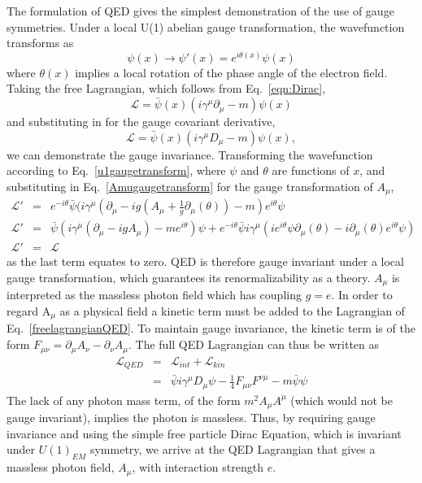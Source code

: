 The formulation of \ac{QED} gives the simplest demonstration of the use of gauge symmetries.
Under a local U(1) abelian gauge transformation, the wavefunction transforms as
\begin{equation}
\psi(x) \rightarrow \psi'(x) = e^{i \theta (x)} \psi(x)
\label{u1gaugetransform}
\end{equation}
where $\theta (x)$ implies a local rotation of the phase angle of the electron field.
Taking the free Lagrangian, which follows from Eq.~\ref{eqn:Dirac},
\begin{equation}
\mathcal{L} =  \bar{\psi}(x) (i \gamma ^{\mu} \partial_{\mu} - m) \psi(x)
\end{equation}
and substituting in for the gauge covariant derivative,
\begin{equation}
\mathcal{L} =  \bar{\psi}(x)(i \gamma ^{\mu} D_{\mu} - m) \psi(x),
\label{freelagrangianQED}
\end{equation}
we can demonstrate the gauge invariance. 
Transforming the wavefunction according to Eq.~\ref{u1gaugetransform}, where $\psi$ and $\theta$ are functions of 
$x$, and substituting in Eq.~\ref{Amugaugetransform} for the gauge transformation of $A_{\mu}$,
\begin{eqnarray}
\mathcal{L}' &=& e^{-i \theta } \bar{\psi} (i \gamma ^{\mu} (\partial_{\mu} - i g (A_{\mu} + \frac{1}{g}\partial_{\mu}(\theta)) - m) e^{i \theta } \psi \\
%
\mathcal{L}' &=& \bar{\psi} (i \gamma ^{\mu} (\partial_{\mu}  - i g A_{\mu}) - m e^{i \theta } ) \psi 
+ e^{-i \theta } \bar{\psi} i \gamma ^{\mu} (i e^{i \theta} \psi \partial_{\mu}(\theta) - i \partial_{\mu}(\theta)e^{i \theta } \psi  ) \\
%
\mathcal{L}' &=& \mathcal{L} 
\end{eqnarray}
as the last term equates to zero.
\ac{QED} is therefore gauge invariant under a local gauge transformation, which guarantees its renormalizability as a theory.
$A_{\mu}$ is interpreted as the massless photon field which has coupling $g=e$.
In order to regard A$_{\mu}$ as a physical field a kinetic term must be added to the Lagrangian of Eq.~\ref{freelagrangianQED}. 
To maintain gauge invariance, the kinetic term is of the form $F_{\mu\nu} = \partial_{\mu}A_{\nu} - \partial_{\nu}A_{\mu}$. The full QED Lagrangian can thus be written as
\begin{eqnarray}
\mathcal{L}_{QED} &=& \mathcal{L}_{int} +  \mathcal{L}_{kin} \\
&=&  \bar{\psi} i \gamma^{\mu} D_{\mu} \psi - \frac{1}{4}F_{\mu\nu}F^{\nu\mu} - m\bar{\psi}\psi 
\label{QEDlagrangian}
\end{eqnarray}
The lack of any photon mass term, of the form $m^{2}A_{\mu}A^{\mu}$ (which would not be gauge invariant), implies the photon is massless.
Thus, by requiring gauge invariance and using the simple free particle Dirac Equation, which is invariant under $U(1)_{EM}$ symmetry, we arrive at the \ac{QED} Lagrangian that gives a massless photon field, $A_{\mu}$, with interaction strength $e$.


